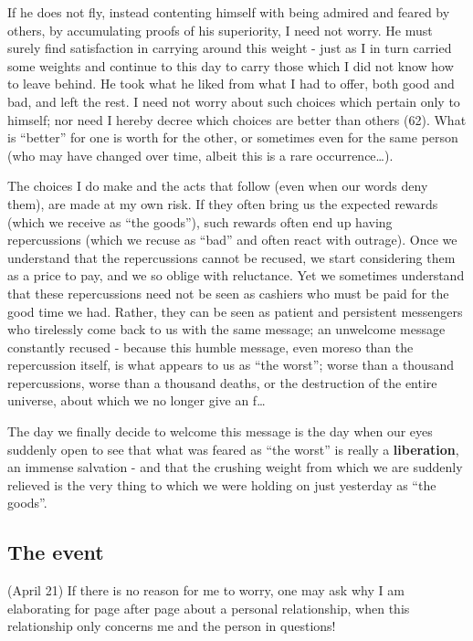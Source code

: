 If he does not fly, instead contenting himself with being admired and feared by others, by
accumulating proofs of his superiority, I need not worry. He must surely find satisfaction
in carrying around this weight - just as I in turn carried 
some weights and continue to this day to carry those which I did not know how to leave behind. 
He took what he liked from what I had to offer, both good and bad, and left the rest. 
I need not worry about such choices which pertain only to himself; nor need I hereby
decree which choices are better than others (62). What is ``better'' for one is worth for
the other, or sometimes even for the same person (who may have changed over time, albeit
this is a rare occurrence\ldots).

The choices I do make and the acts that follow (even when our words deny them), 
are made at my own risk. If they often bring us the expected rewards (which we receive as
``the goods''), such rewards often end up having repercussions 
(which we recuse as ``bad'' and often react with outrage).
Once we understand that the repercussions cannot be recused, we start considering them as
a price to pay, and we so oblige with reluctance. 
Yet we sometimes understand that these repercussions need not be seen as cashiers 
who must be paid for the good time we had.
Rather, they can be seen as patient and persistent messengers who tirelessly 
come back to us with the same message; an unwelcome message constantly recused
- because this humble message, even moreso than the repercussion itself, is what appears
to us as ``the worst''; worse than a thousand repercussions, worse than a thousand deaths,
or the destruction of the entire universe, about which we no longer give an f\ldots

The day we finally decide to welcome this message is the day when our
eyes suddenly open to see that what was feared as ``the worst'' is really a
\textbf{liberation}, an immense salvation - and that the crushing weight from which we are
suddenly relieved is the very thing to which we were holding on just yesterday as ``the
goods''.

\subsection{The event}

 (April 21) 
If there is no reason for me to worry, one may ask why I am elaborating for page after
page about a personal relationship,
when this relationship only concerns me and the
person in questions!

